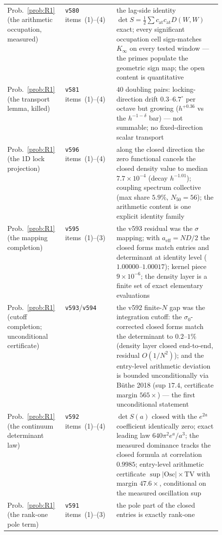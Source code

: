 \documentclass[11pt,a4paper]{article}
\theoremstyle{plain}
\theoremstyle{definition}
\begin{document}
{\begin{xltabular}{\textwidth}{@{}p{0.27\linewidth}p{0.24\linewidth}Y@{}}
Prob.~\ref{prob:R1} (the arithmetic occupation, measured)
  & \texttt{v580} items~(1)--(4)
  & the lag-side identity $\det S=\tfrac12\sum c_{\mathrm{at}}
    c_{\mathrm{at}}D(W,W)$ exact; every significant occupation cell
    sign-matches $K_\infty$ on every tested window --- the primes
    populate the geometric sign map; the open content is quantitative \\
Prob.~\ref{prob:R1} (the transport lemma, killed)
  & \texttt{v581} items~(1)--(4)
  & $40$ doubling pairs: locking-direction drift $0.3$--$6.7^\circ$ per
    octave but growing ($h^{+0.36}$ vs the $h^{-1-\delta}$ bar) --- not
    summable; no fixed-direction scalar transport \\
Prob.~\ref{prob:R1} (the 1D lock projection)
  & \texttt{v596} items~(1)--(4)
  & along the closed direction the zero functional cancels the closed
    density value to median $7.7\times10^{-4}$ (decay $h^{-1.01}$);
    coupling spectrum collective (max share $5.9\%$, $N_{50}=56$);
    the arithmetic content is one explicit identity family \\
Prob.~\ref{prob:R1} (the mapping completion)
  & \texttt{v595} items~(1)--(3)
  & the v593 residual was the $\sigma$ mapping; with
    $a_{\mathrm{eff}}=ND/2$ the closed forms match entries and
    determinant at identity level ($1.00000$--$1.00017$); kernel piece
    $9\times10^{-6}$; the density layer is a finite set of exact
    elementary evaluations \\
Prob.~\ref{prob:R1} (cutoff completion; unconditional certificate)
  & \texttt{v593}/\texttt{v594}
  & the v592 finite-$N$ gap was the integration cutoff: the
    $\sigma_0$-corrected closed forms match the determinant to
    $0.2$--$1\%$ (density layer closed end-to-end, residual
    $O(1/N^2)$); and the entry-level arithmetic deviation is bounded
    unconditionally via B\"uthe 2018 (sup $17.4$, certificate margin
    $565\times$) --- the first unconditional statement \\
Prob.~\ref{prob:R1} (the continuum determinant law)
  & \texttt{v592} items~(1)--(4)
  & $\det S(a)$ closed with the $e^{2a}$ coefficient identically zero;
    exact leading law $640\pi^2e^a/a^3$; the measured dominance tracks
    the closed formula at correlation $0.9985$; entry-level arithmetic
    certificate $\sup|\mathrm{Osc}|\times\mathrm{TV}$ with margin
    $47.6\times$, conditional on the measured oscillation sup \\
Prob.~\ref{prob:R1} (the rank-one pole term)
  & \texttt{v591} items~(1)--(3)
  & the pole part of the closed entries is exactly rank-one

\end{xltabular}}
\end{document}

